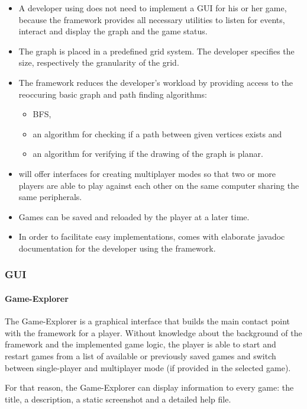 \begin{itemize}
	\item A \gls{developer} using {\graphioli} does not need to implement a \gls{GUI} for his or her game, because the framework provides all necessary utilities to listen for events, interact and display the graph and the game status.

	\item The graph is placed in a predefined grid system. The developer specifies the size, respectively the granularity of the grid.

	\item The framework reduces the developer's workload by providing access to the reoccuring basic graph and \gls{path} finding algorithms:
	\begin{itemize}
		\item \gls{BFS},
		\item an algorithm for checking if a path between given vertices exists and
		\item an algorithm for verifying if the drawing of the graph is \gls{planar}.
	\end{itemize}

	\item {\graphioli} will offer interfaces for creating multiplayer modes so that two or more \glspl{player} are able to play against each other on the same computer sharing the same peripherals.

	\item Games can be saved and reloaded by the player at a later time.

	\item In order to facilitate easy implementations, {\graphioli} comes with elaborate \Gls{javadoc} documentation for the developer using the framework.

\end{itemize}

\subsubsection{GUI}

\paragraph*{Game-Explorer}
The Game-Explorer is a graphical interface that builds the main contact point with the framework for a \gls{player}. Without knowledge about the background of the framework and the implemented \gls{game} logic, the player is able to start and restart games from a list of available or previously saved games and switch between single-player and multiplayer mode (if provided in the selected game).\par
For that reason, the Game-Explorer can display information to every game: the title, a description, a static screenshot and a detailed help file.
